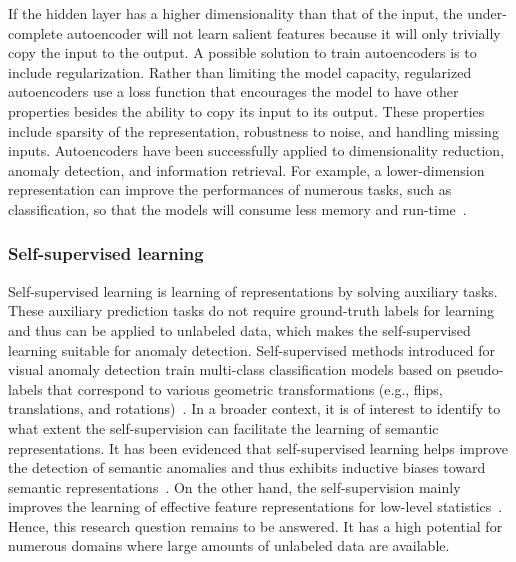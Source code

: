 If the hidden layer has a higher dimensionality than that of the input, the under-complete autoencoder will not learn salient features because it will only trivially copy the input to the output. A possible solution to train autoencoders is to include regularization. Rather than limiting the model capacity, regularized autoencoders use a loss function that encourages the model to have other properties besides the ability to copy its input to its output. These properties include sparsity of the representation, robustness to noise, and handling missing inputs. 
Autoencoders have been successfully applied to dimensionality reduction, anomaly detection, and information retrieval. For example, a lower-dimension representation can improve the performances of numerous tasks, such as classification, so that the models will consume less memory and run-time~\cite{ruff2020unifying,pang2020deep}.

\newpage

\subsubsection{Self-supervised learning}
\label{ch:background:sec:anomalydetection:subsec:deepanomaly:subsubsec:selfsupervised}
Self-supervised learning is learning of representations by solving auxiliary tasks. These auxiliary prediction tasks do not require ground-truth labels for learning and thus can be applied to unlabeled data, which makes the self-supervised learning suitable for anomaly detection.
Self-supervised methods introduced for visual anomaly detection train multi-class classification models based on pseudo-labels that correspond to various geometric transformations (e.g., flips, translations, and rotations)~\cite{hendrycks2019using}.
In a broader context, it is of interest to identify to what extent the self-supervision can facilitate the learning of semantic representations.
It has been evidenced that self-supervised learning helps improve the detection of semantic anomalies and thus exhibits inductive biases toward semantic representations~\cite{ahmed2019detecting}.
On the other hand, the self-supervision mainly improves the learning of effective feature representations for low-level statistics~\cite{asano2020critical}.
Hence, this research question remains to be answered. It has a high potential for numerous domains where large amounts of unlabeled data are available.


